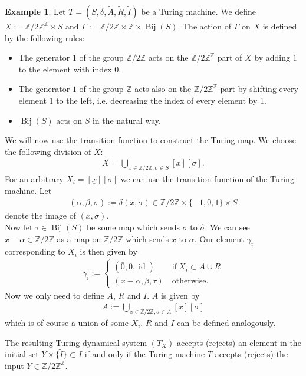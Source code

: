 \documentclass[12pt,a4paper]{scrartcl}
\theoremstyle{plain}
\theoremstyle{definition}
\newtheorem{Example}[Theorem]{Example}
\newcommand{\Z}{\mathbb{Z}} %
\newcommand{\2}{\mathbb{Z} / 2 \mathbb{Z}}
\newcommand{\1}{\bar{1}}
\newcommand{\0}{\bar{0}}
\newcommand{\Bij}{\operatorname{Bij}}
\newcommand{\id}{\operatorname{id}}
\begin{document}
\begin{Example}\label{TMtoTDS}
	Let  $T=(S,\delta, \tilde{A}, \tilde{R}, \tilde{I})$ be a Turing machine. We define $X := \2^\Z \times S$ and $\Gamma := \2 \times \Z \times \Bij(S)$.
	The action of $\Gamma$ on $X$ is defined by the following rules:
	\begin{itemize}
		\item The generator $\1$ of the group $\Z / 2\Z$ acts on the $\Z / 2\Z^\Z$ part of $X$ by adding $\1$ to the element with index $0$.
		\item The generator $1$ of the group $\Z$ acts also on the $\Z / 2\Z^\Z$ part by shifting every element 1 to the left, i.e. decreasing the index of every element by 1.
		\item $\Bij(S)$ acts on $S$ in the natural way.
	\end{itemize}
	We will now use the transition function to construct the Turing map. We choose the following division of $X$:
	\begin{align*}
	X = \bigcup_{x \in \2, \sigma \in S} [\underline{x}][\sigma].
	\end{align*}
	For an arbitrary $X_i = [\underline{x}][\sigma]$ we can use the transition function of the Turing machine. Let
	\begin{align*}
		(\alpha, \beta,\hat{\sigma}) := \delta(x, \sigma) \in \2 \times \{-1, 0, 1\} \times S
	\end{align*} 
	denote  the image of $(x, \sigma)$. \\
	Now let $\tau \in \Bij(S)$ be some map which sends $\sigma$ to $\hat{\sigma}$. We can see $x-\alpha \in \2$ as a map on $\2$ which sends $x$ to $\alpha$. Our element $\gamma_i$ corresponding to $X_i$ is then given by 
	\begin{align*}
		\gamma_i := \begin{cases}
			(\0, 0, \id) & ~\text{if}~ X_i \subset A \cup R \\
			(x-\alpha, \beta, \tau) & ~\text{otherwise.}
		\end{cases}
	\end{align*} 
	Now we only need to define $A$, $R$ and $I$. $A$ is given by
	\begin{align*}
	A := \bigcup_{x \in \2, \sigma \in \tilde{A}}[\underline{x}][\sigma]
	\end{align*}
	which is of course a union of some $X_i$. $R$ and $I$ can be defined analogously. 
	
	The resulting Turing dynamical system $(T_X)$ accepts (rejects) an element in the initial set $Y \times \{\tilde{I}\} \subset I$ if and only if the Turing machine $T$ accepts (rejects) the input $Y \in \2^\Z$.
\end{Example}
\end{document}
